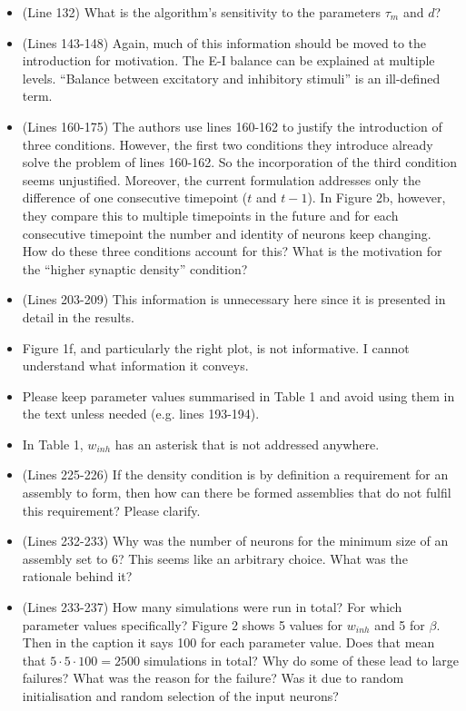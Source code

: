 \documentclass[a4paper, 11pt]{article}
\begin{document}
\begin{itemize}
    \item (Line 132) What is the algorithm's sensitivity to the parameters $\tau_m$ and $d$?
    
    \item (Lines 143-148) Again, much of this information should be moved to the introduction for motivation. The E-I balance can be explained at multiple levels. ``Balance between excitatory and inhibitory stimuli'' is an ill-defined term.
    
    \item (Lines 160-175) The authors use lines 160-162 to justify the introduction of three conditions. However, the first two conditions they introduce already solve the problem of lines 160-162. So the incorporation of the third condition seems unjustified. Moreover, the current formulation addresses only the difference of one consecutive timepoint ($t$ and $t-1$). In Figure 2b, however, they compare this to multiple timepoints in the future and for each consecutive timepoint the number and identity of neurons keep changing. How do these three conditions account for this? What is the motivation for the ``higher synaptic density'' condition?
    
    \item (Lines 203-209) This information is unnecessary here since it is presented in detail in the results.
    
    \item Figure 1f, and particularly the right plot, is not informative. I cannot understand what information it conveys.
    
    \item Please keep parameter values summarised in Table 1 and avoid using them in the text unless needed (e.g. lines 193-194).
    
    \item In Table 1, $w_{inh}$ has an asterisk that is not addressed anywhere.
    
    \item (Lines 225-226) If the density condition is by definition a requirement for an assembly to form, then how can there be formed assemblies that do not fulfil this requirement? Please clarify.
    
    \item (Lines 232-233) Why was the number of neurons for the minimum size of an assembly set to 6? This seems like an arbitrary choice. What was the rationale behind it?
    
    \item (Lines 233-237) How many simulations were run in total? For which parameter values specifically? Figure 2 shows 5 values for $w_{inh}$ and 5 for $\beta$. Then in the caption it says 100 for each parameter value. Does that mean that $5 \cdot 5 \cdot 100 = 2500$ simulations in total? Why do some of these lead to large failures? What was the reason for the failure? Was it due to random initialisation and random selection of the input neurons?
    

\end{itemize}
\end{document}
